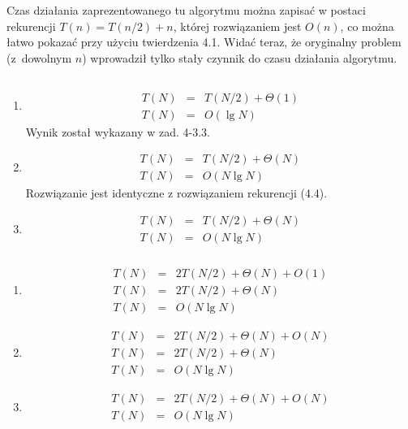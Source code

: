 Czas działania zaprezentowanego tu algorytmu można zapisać w postaci rekurencji $T(n)=T(n/2)+n$, której rozwiązaniem jest $O(n)$, co można łatwo pokazać przy użyciu twierdzenia 4.1. Widać teraz, że oryginalny problem (z~dowolnym $n$) wprowadził tylko stały czynnik do czasu działania algorytmu.

\subsection{} %

\subsubsection{} %
\begin{enumerate}
	\item
	\begin{eqnarray*}
		T(N) &=& T(N/2)+\Theta(1) \\
		T(N) &=& O(\lg N)
	\end{eqnarray*}
	Wynik został wykazany w zad. 4-3.3.
	\item
	\begin{eqnarray*}
		T(N) &=& T(N/2)+\Theta(N) \\
		T(N) &=& O(N\lg N)
	\end{eqnarray*}
	Rozwiązanie jest identyczne z rozwiązaniem rekurencji (4.4).
	\item
	\begin{eqnarray*}
		T(N) &=& T(N/2)+\Theta(N) \\
		T(N) &=& O(N\lg N)
	\end{eqnarray*}
\end{enumerate}

\subsubsection{} %
\begin{enumerate}
	\item
	\begin{eqnarray*}
		T(N) &=& 2T(N/2)+\Theta(N)+O(1) \\
		T(N) &=& 2T(N/2)+\Theta(N) \\
		T(N) &=& O(N\lg N)
	\end{eqnarray*}
	\item
	\begin{eqnarray*}
		T(N) &=& 2T(N/2)+\Theta(N)+O(N) \\
		T(N) &=& 2T(N/2)+\Theta(N) \\
		T(N) &=& O(N\lg N)
	\end{eqnarray*}
	\item
	\begin{eqnarray*}
		T(N) &=& 2T(N/2)+\Theta(N)+O(N) \\
		T(N) &=& O(N\lg N)
	\end{eqnarray*}
\end{enumerate}

